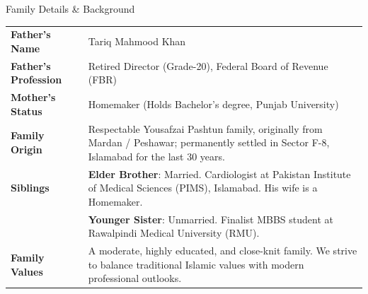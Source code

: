 \documentclass[10pt,a4paper]{article}
\begin{document}
\vspace{1.0em}

\begin{biodatabox}{\faUsers\enskip Family Details \& Background}
  \renewcommand{\arraystretch}{1.2}
  \begin{tabularx}{\textwidth}{@{} >{\bfseries\color{DeepEmerald}} l @{\hspace{12pt}} X @{}}
    Father's Name & Tariq Mahmood Khan \\
    Father's Profession & Retired Director (Grade-20), Federal Board of Revenue (FBR) \\
    Mother's Status & Homemaker (Holds Bachelor's degree, Punjab University) \\
    Family Origin & Respectable Yousafzai Pashtun family, originally from Mardan / Peshawar; permanently settled in Sector F-8, Islamabad for the last 30 years. \\
    Siblings & \textbf{Elder Brother}: Married. Cardiologist at Pakistan Institute of Medical Sciences (PIMS), Islamabad. His wife is a Homemaker. \\
             & \textbf{Younger Sister}: Unmarried. Finalist MBBS student at Rawalpindi Medical University (RMU). \\
    Family Values & A moderate, highly educated, and close-knit family. We strive to balance traditional Islamic values with modern professional outlooks.
  \end{tabularx}
\end{biodatabox}

\vspace{1.0em}
\end{document}
